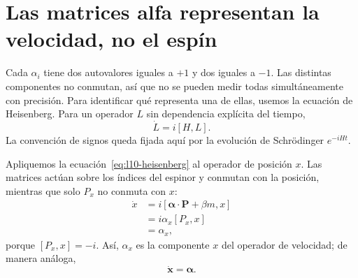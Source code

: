 \begin{classroomqa}
\end{classroomqa}

\section{Las matrices alfa representan la velocidad, no el espín}

Cada \(\alpha_i\) tiene dos autovalores iguales a \(+1\) y dos iguales a \(-1\). Las distintas componentes no conmutan, así que no se pueden medir todas simultáneamente con precisión. Para identificar qué representa una de ellas, usemos la ecuación de Heisenberg. Para un operador \(L\) sin dependencia explícita del tiempo,
\begin{equation}
\dot L=i[H,L].
\label{eq:l10-heisenberg}
\end{equation}
La convención de signos queda fijada aquí por la evolución de Schr\"odinger \(e^{-iHt}\).

Apliquemos la ecuación~\eqref{eq:l10-heisenberg} al operador de posición \(x\). Las matrices actúan sobre los índices del espinor y conmutan con la posición, mientras que solo \(P_x\) no conmuta con \(x\):
\begin{align}
\dot x
&=i[\boldsymbol{\alpha}\cdot\mathbf P+\beta m,x]\\
&=i\alpha_x[P_x,x]\\
&=\alpha_x,
\label{eq:l10-velocity}
\end{align}
porque \([P_x,x]=-i\). Así, \(\alpha_x\) es la componente \(x\) del operador de velocidad; de manera análoga,
\begin{equation}
\dot{\mathbf x}=\boldsymbol{\alpha}.
\end{equation}

\begin{classroomqa}
\end{classroomqa}

